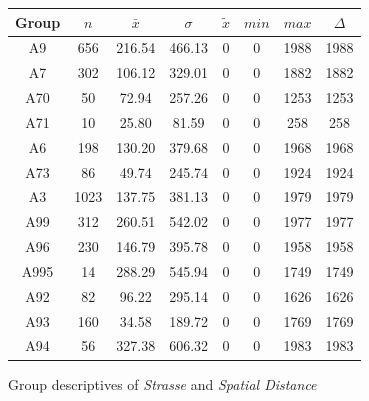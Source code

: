 \begin{figure}[ht!]
	\centering
	\begin{minipage}{0.5\textwidth}
		\tiny
		\centering
		\begin{tabular}{c|c|c|c|c|c|c|c}
			\toprule
			Group & $n$ & $\bar{x}$ & $\sigma$ & $\tilde{x}$ & $min$ & $max$ & $\Delta$ \\
			\midrule
			A9   & 656  & 216.54 & 466.13 & 0 & 0 & 1988 & 1988 \\ 
			A7   & 302  & 106.12 & 329.01 & 0 & 0 & 1882 & 1882 \\ 
			A70  & 50   & 72.94  & 257.26 & 0 & 0 & 1253 & 1253 \\ 
			A71  & 10   & 25.80  & 81.59  & 0 & 0 & 258  & 258  \\ 
			A6   & 198  & 130.20 & 379.68 & 0 & 0 & 1968 & 1968 \\ 
			A73  & 86   & 49.74  & 245.74 & 0 & 0 & 1924 & 1924 \\ 
			A3   & 1023 & 137.75 & 381.13 & 0 & 0 & 1979 & 1979 \\ 
			A99  & 312  & 260.51 & 542.02 & 0 & 0 & 1977 & 1977 \\ 
			A96  & 230  & 146.79 & 395.78 & 0 & 0 & 1958 & 1958 \\ 
			A995 & 14   & 288.29 & 545.94 & 0 & 0 & 1749 & 1749 \\ 
			A92  & 82   & 96.22  & 295.14 & 0 & 0 & 1626 & 1626 \\ 
			A93  & 160  & 34.58  & 189.72 & 0 & 0 & 1769 & 1769 \\ 
			A94  & 56   & 327.38 & 606.32 & 0 & 0 & 1983 & 1983 \\ 
			\bottomrule
		\end{tabular}
		\label{tbl:descriptives_arbis_matched_Strasse_SDist}
	\end{minipage}%
	\begin{minipage}{0.55\textwidth}
		\tiny
		\centering
		\vfill
		\label{fig:descriptives_arbis_matched_Strasse_SDist}
	\end{minipage}%
	\caption{Group descriptives of \textit{Strasse} and \textit{Spatial Distance}}
\end{figure}
